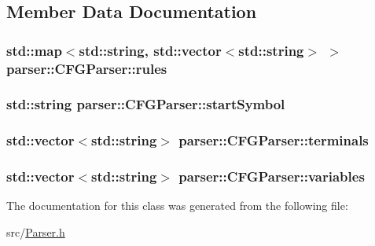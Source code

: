 \subsection{\-Member \-Data \-Documentation}
\hypertarget{classparser_1_1CFGParser_a2848eb1b568b538e2f49d237cd32351d}{
\subsubsection[{rules}]{\setlength{\rightskip}{0pt plus 5cm}std\-::map$<$std\-::string, std\-::vector$<$std\-::string$>$ $>$ {\bf parser\-::\-C\-F\-G\-Parser\-::rules}}}\label{de/d63/classparser_1_1CFGParser_a2848eb1b568b538e2f49d237cd32351d}
\hypertarget{classparser_1_1CFGParser_a6d3a8eefa11cca703d7126031c59d220}{
\subsubsection[{start\-Symbol}]{\setlength{\rightskip}{0pt plus 5cm}std\-::string {\bf parser\-::\-C\-F\-G\-Parser\-::start\-Symbol}}}\label{de/d63/classparser_1_1CFGParser_a6d3a8eefa11cca703d7126031c59d220}
\hypertarget{classparser_1_1CFGParser_a5709544c0a9981997043f38489f2ddff}{
\subsubsection[{terminals}]{\setlength{\rightskip}{0pt plus 5cm}std\-::vector$<$std\-::string$>$ {\bf parser\-::\-C\-F\-G\-Parser\-::terminals}}}\label{de/d63/classparser_1_1CFGParser_a5709544c0a9981997043f38489f2ddff}
\hypertarget{classparser_1_1CFGParser_a683c57ac6f377ad4fa4c074df294ee4d}{
\subsubsection[{variables}]{\setlength{\rightskip}{0pt plus 5cm}std\-::vector$<$std\-::string$>$ {\bf parser\-::\-C\-F\-G\-Parser\-::variables}}}\label{de/d63/classparser_1_1CFGParser_a683c57ac6f377ad4fa4c074df294ee4d}


\-The documentation for this class was generated from the following file\-:\begin{DoxyCompactItemize}
\item 
src/\hyperlink{Parser_8h}{\-Parser.\-h}\end{DoxyCompactItemize}
